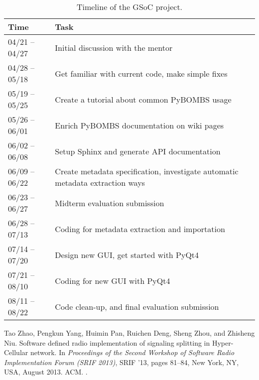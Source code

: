 \documentclass[a4paper]{article}
\begin{document}
\begin{table}[htbp]
  \centering
  \begin{tabular}{lp{}}
    \hline
    Time & Task \\
    \hline
    04/21 -- 04/27 & Initial discussion with the mentor \\
    04/28 -- 05/18 & Get familiar with current code, make simple fixes \\
    05/19 -- 05/25 & Create a tutorial about common PyBOMBS usage\\
    05/26 -- 06/01 & Enrich PyBOMBS documentation on wiki pages \\
    06/02 -- 06/08 & Setup Sphinx and generate API documentation \\
    06/09 -- 06/22 & Create metadata specification, investigate
    automatic metadata extraction ways\\
    06/23 -- 06/27 & Midterm evaluation submission\\
    06/28 -- 07/13 & Coding for metadata extraction and importation \\
    07/14 -- 07/20 & Design new GUI, get started with PyQt4 \\
    07/21 -- 08/10 & Coding for new GUI with PyQt4 \\
    08/11 -- 08/22 & Code clean-up, and final evaluation submission \\
    \hline
  \end{tabular}
  \caption{Timeline of the GSoC project.}
  \label{tab:timeline}
\end{table}

\begin{thebibliography}{1}

Tao Zhao, Pengkun Yang, Huimin Pan, Ruichen Deng, Sheng Zhou, and Zhisheng Niu.
\newblock Software defined radio implementation of signaling splitting in
  {Hyper-Cellular} network.
\newblock In {\em Proceedings of the Second Workshop of Software Radio
  Implementation Forum (SRIF 2013)}, SRIF '13, pages 81--84, New York, NY, USA,
  August 2013. ACM.
\newblock \href {http://dx.doi.org/10.1145/2491246.2491258}
  {}.

\end{thebibliography}
\end{document}
